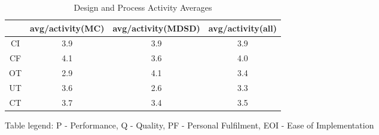 \documentclass[final_report_innit.tex]{subfiles}
\begin{document}
\begin{table}[h]
\caption{Design and Process Activity Averages}
\centering
\begin{tabular}{@{}c|c|c|c|@{}}
\cmidrule(l){2-4}
\multicolumn{1}{l|}{}    & \multicolumn{1}{l|}{avg/activity(MC)} & \multicolumn{1}{l|}{avg/activity(MDSD)} & \multicolumn{1}{l|}{avg/activity(all)} \\ \midrule
\multicolumn{1}{|c|}{CI} & 3.9                                & 3.9                                 & 3.9                                 \\ \midrule
\multicolumn{1}{|c|}{CF} & 4.1                                & 3.6                                 & 4.0                                 \\ \midrule
\multicolumn{1}{|c|}{OT} & 2.9                                & 4.1                                 & 3.4                                 \\ \midrule
\multicolumn{1}{|c|}{UT} & 3.6                                & 2.6                                 & 3.3                                 \\ \midrule
\multicolumn{1}{|c|}{CT} & 3.7                                & 3.4                                 & 3.5                                 \\ \bottomrule
\end{tabular}
\end{table}

Table legend:
P - Performance,
Q - Quality,
PF - Personal Fulfilment,
EOI - Ease of Implementation
\end{document}
